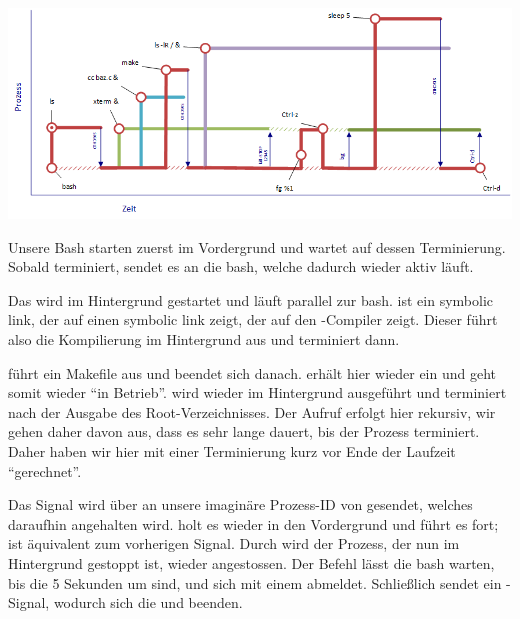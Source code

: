 
\begin{center}
    \includegraphics[width=\textwidth]{Sourcen/Aufgabe3.png}
\end{center}

Unsere Bash starten zuerst  im Vordergrund und wartet auf dessen Terminierung.
Sobald  terminiert, sendet es  an die bash, welche dadurch wieder aktiv läuft. \par\medskip

Das  wird im Hintergrund gestartet und läuft parallel zur bash. \newline
{} ist ein symbolic link, der auf einen symbolic link zeigt, der auf den -Compiler zeigt.
Dieser führt also die Kompilierung im Hintergrund aus und terminiert dann. \par\medskip

 führt ein Makefile aus und beendet sich danach.
 erhält hier wieder ein  und geht somit wieder ``in Betrieb''. \newline
{} wird wieder im Hintergrund ausgef\"{u}hrt und terminiert nach der Ausgabe des Root-Verzeichnisses.
Der Aufruf erfolgt hier rekursiv, wir gehen daher davon aus, dass es sehr lange dauert, bis der Prozess terminiert.
Daher haben wir hier mit einer Terminierung kurz vor Ende der Laufzeit ``gerechnet''. \par\medskip

Das Signal  wird über  an unsere imaginäre Prozess-ID von  gesendet, welches daraufhin angehalten wird.
 holt es wieder in den Vordergrund und führt es fort;  ist äquivalent zum vorherigen Signal.
Durch  wird der Prozess, der nun im Hintergrund gestoppt ist, wieder angestossen.
Der Befehl  lässt die bash warten, bis die 5 Sekunden um sind, und sich  mit einem  abmeldet. \newline
Schließlich sendet  ein -Signal, wodurch sich die  und  beenden.
